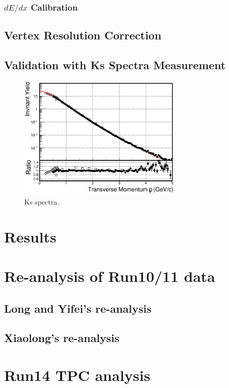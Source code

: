 \documentclass[a4paper]{article}
\begin{document}
\subsubsection{$dE/dx$ Calibration}



\subsection{Vertex Resolution Correction}

\subsection{Validation with Ks Spectra Measurement}

\begin{figure}
\centering
\includegraphics[width=0.7\textwidth]{fig/Ks_spectra_PtCut_0.eps}
\caption{\label{fig:Ks_spectra}Ks spectra.}
\end{figure}

\section{\label{results}Results}

\section{\label{Run1011}Re-analysis of Run10/11 data}

\subsection{Long and Yifei's re-analysis}

\subsection{Xiaolong's re-analysis}

\section{\label{Run14TPC}Run14 TPC analysis}



\end{document}
